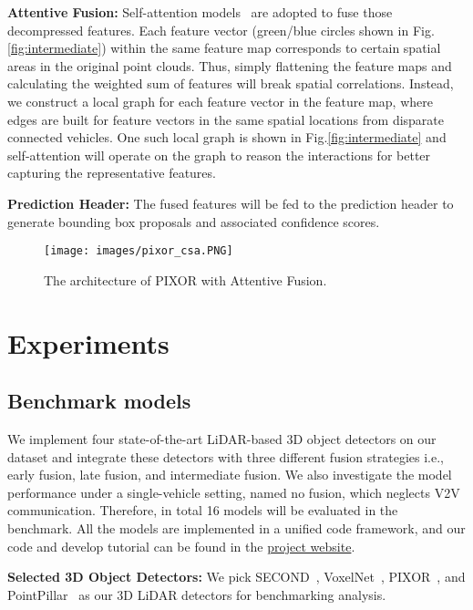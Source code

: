 \documentclass[letterpaper, 10 pt, conference]{ieeeconf}
\begin{document}
\noindent\textbf{Attentive Fusion: }Self-attention models~\cite{vaswani2017attention} are adopted to fuse those decompressed features. Each feature vector (green/blue circles shown in Fig.\ref{fig:intermediate}) within the same feature map corresponds to certain spatial areas in the original point clouds. Thus, simply flattening the feature maps and calculating the weighted sum of features will break spatial correlations. Instead, we construct a local graph for each feature vector in the feature map, where edges are built for feature vectors in the same spatial locations from disparate connected vehicles. One such local graph is shown in Fig.\ref{fig:intermediate} and self-attention will operate on the graph to reason the interactions for better capturing the representative features. 

\noindent\textbf{Prediction Header: }The fused features will be fed to the prediction header to generate bounding box proposals and associated confidence scores. 

\begin{figure}
    \centering
    \texttt{[image: images/pixor\_csa.PNG]}
    \caption{The architecture of PIXOR with Attentive Fusion. }
    \label{fig:pixor}
\end{figure}

\section{Experiments}

\subsection{Benchmark models}
We implement four state-of-the-art LiDAR-based 3D object detectors on our dataset and integrate these detectors with three different fusion strategies i.e., early fusion, late fusion, and intermediate fusion. We also investigate the model performance under a single-vehicle setting, named no fusion, which neglects V2V communication. Therefore, in total 16 models will be evaluated in the benchmark. All the models are implemented in a unified code framework, and  our code and develop tutorial can be found in the \textcolor{blue}{\href{https://mobility-lab.seas.ucla.edu/opv2v/}{project website}}.


\noindent\textbf{Selected 3D Object Detectors: } 
We pick SECOND~\cite{Yan2018SECONDSE}, VoxelNet~\cite{voxelnet}, PIXOR~\cite{Yang2018PIXORR3}, and PointPillar~\cite{pointpillar} as our 3D LiDAR detectors for benchmarking analysis.
\end{document}
